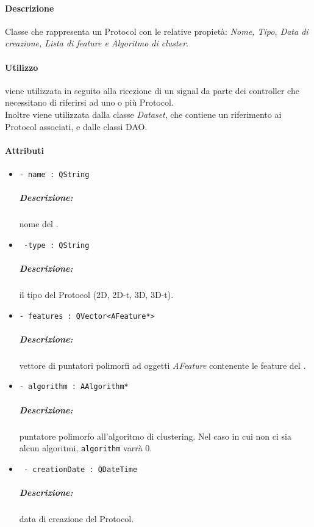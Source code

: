 \paragraph{Descrizione \\}
Classe che rappresenta un Protocol\g{} con le relative propietà: \emph{Nome, Tipo, Data di creazione, Lista di feature\g{} e Algoritmo di cluster\g{}}.

\paragraph{Utilizzo \\}
viene utilizzata in seguito alla ricezione di un signal\g{} da parte dei controller che necessitano di riferirsi ad uno o più Protocol\g{}.
\\Inoltre viene utilizzata dalla classe \textsl{Dataset}, che contiene un riferimento ai Protocol\g{} associati, e dalle classi DAO.

\paragraph{Attributi}
	\begin{itemize}
		\item \color{teal}\verb!- name : QString !
		\color{black}\subparagraph{Descrizione:} nome del \protocol{}.
		
		\item \color{teal}\verb! -type : QString !
		\color{black}\subparagraph{Descrizione:} il tipo del Protocol\g{} (2D, 2D-t, 3D, 3D-t).
		
		\item \color{teal}\verb!- features : QVector<AFeature*> !
		\color{black} \subparagraph{Descrizione: } vettore di puntatori polimorfi ad oggetti \textsl{AFeature} contenente le feature\g{} del \protocol{}.
		
		\item \color{teal}\verb!- algorithm : AAlgorithm* !
		\color{black}\subparagraph{Descrizione:} puntatore polimorfo all'algoritmo di clustering\g{}. Nel caso in cui non ci sia alcun algoritmi, \verb!algorithm! varrà 0.
		
		\item \color{teal}\verb! - creationDate : QDateTime !
		\color{black}\subparagraph{Descrizione:} data di creazione del Protocol\g{}.
		
	\end{itemize}


